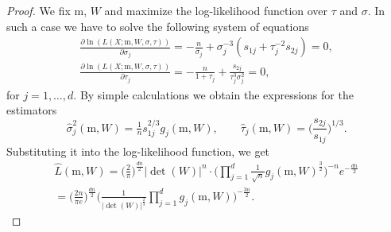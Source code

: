 \documentclass[12pt]{article}
\def\m{\mathrm{m}}
\theoremstyle{definition}
\begin{document}
\begin{proof}
We fix  $\m$, $W$ and maximize the log-likelihood function over $\tau$ and $\sigma$.
In such a case we have to solve the following system of equations
$$
\begin{array}{l}
\frac{\partial  \ln ( L(X;\m,W,\sigma,\tau) ) }{\partial \sigma_j} = -\frac{n}{\sigma_j} +  \sigma_j^{-3} (s_{1j} + \tau_j^{-2} s_{2j} )
 =0, \\[6pt] %
 \frac{\partial  \ln ( L(X;\m,W,\sigma,\tau) ) }{\partial \tau_j} = - \frac{n}{1+\tau_j} + \frac{s_{2j}}{\tau_j^{3}\sigma_j^{2}} =0 , %
\end{array}
$$
for  $ j=1,\ldots,d$.
By simple calculations we obtain the expressions for the estimators
$$
\hat{\sigma}_j^2(\m,W) = 
\tfrac{1}{n} s_{1j}^{2/3} g_{j}(\m,W), \qquad
\hat{\tau}_{j}(\m,W) = \bigg( \frac{s_{2j}}{s_{1j}} \bigg)^{1/3}.
$$
Substituting it into the log-likelihood function,
we get
$$
\begin{array}{l}
\hat{L}(\m,W) = \bigg( \frac{2}{\pi} \bigg)^{\frac{dn}{2}}  |\det(W)|^{n} \cdot \Big( \prod\limits_{j=1}^{d} \frac{1}{\sqrt{n}} g_j(\m,W)^{\frac{3}{2}} \Big)^{-n}  e^{-\frac{dn}{2}}\\[6pt]
= \bigg( \frac{2n}{\pi e} \bigg)^{\frac{dn}{2}}  \Big( \frac{1}{|\det(W)|^{\frac{2}{3}}} \prod\limits_{j=1}^{d} g_j(\m,W) \Big)^{-\frac{3n}{2}}. 
\end{array}
$$
\end{proof}




\end{document}
